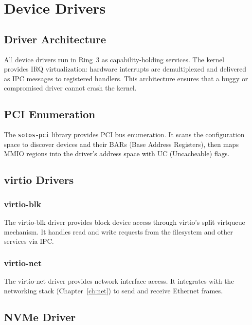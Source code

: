 \documentclass[11pt,a4paper,twoside]{report}
\theoremstyle{definition}
\begin{document}
\chapter{Device Drivers}
\label{ch:drivers}

\section{Driver Architecture}

All device drivers run in Ring~3 as capability-holding services. The kernel
provides IRQ virtualization: hardware interrupts are demultiplexed and
delivered as IPC messages to registered handlers. This architecture ensures
that a buggy or compromised driver cannot crash the kernel.

\section{PCI Enumeration}

The \texttt{sotos-pci} library provides PCI bus enumeration. It scans the
configuration space to discover devices and their BARs (Base Address
Registers), then maps MMIO regions into the driver's address space with
UC (Uncacheable) flags.

\section{virtio Drivers}

\subsection{virtio-blk}

The virtio-blk driver provides block device access through virtio's split
virtqueue mechanism. It handles read and write requests from the filesystem
and other services via IPC.

\subsection{virtio-net}

The virtio-net driver provides network interface access. It integrates with
the networking stack (Chapter~\ref{ch:net}) to send and receive Ethernet
frames.

\section{NVMe Driver}
\end{document}
